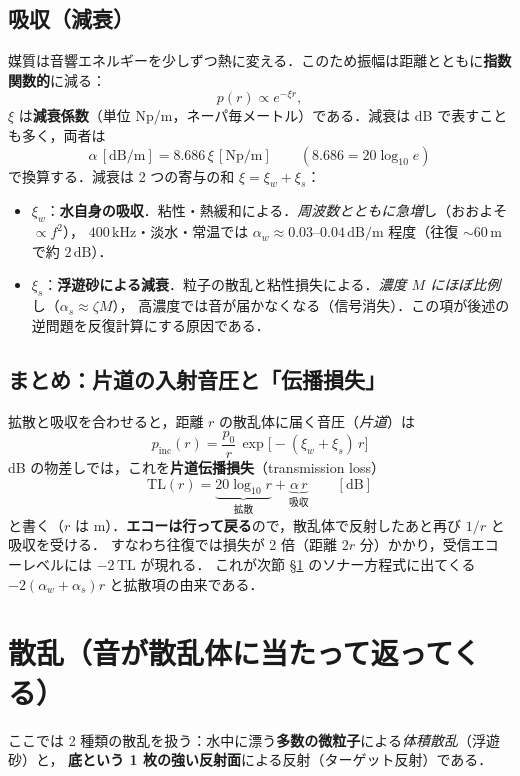 \documentclass[11pt]{ltjsarticle}
\newcommand{\unit}[1]{\,\mathrm{#1}}
\begin{document}
\subsection{吸収（減衰）}
媒質は音響エネルギーを少しずつ熱に変える．このため振幅は距離とともに\textbf{指数関数的}に減る：
\begin{equation}
p(r)\propto e^{-\xi r},
\end{equation}
$\xi$ は\textbf{減衰係数}（単位 Np/m，ネーパ毎メートル）である．減衰は dB で表すことも多く，両者は
\begin{equation}
\alpha\,[\mathrm{dB/m}]=8.686\,\xi\,[\mathrm{Np/m}]\qquad(8.686=20\log_{10}e)
\end{equation}
で換算する．減衰は 2 つの寄与の和 $\xi=\xi_w+\xi_s$：
\begin{itemize}[nosep]
  \item $\xi_w$：\textbf{水自身の吸収}．粘性・熱緩和による．\emph{周波数とともに急増}し（おおよそ $\propto f^2$），
        $400\unit{kHz}$・淡水・常温では $\alpha_w\approx 0.03$–$0.04\unit{dB/m}$ 程度（往復 $\sim\!60\unit{m}$ で約 $2\unit{dB}$）．
  \item $\xi_s$：\textbf{浮遊砂による減衰}．粒子の散乱と粘性損失による．\emph{濃度 $M$ にほぼ比例}し（$\alpha_s\approx\zeta M$），
        高濃度では音が届かなくなる（信号消失）．この項が後述の逆問題を反復計算にする原因である．
\end{itemize}

\subsection{まとめ：片道の入射音圧と「伝播損失」}
拡散と吸収を合わせると，距離 $r$ の散乱体に届く音圧（\emph{片道}）は
\begin{equation}
\boxed{\;p_{\mathrm{inc}}(r)=\frac{p_0}{r}\,\exp\!\big[-(\xi_w+\xi_s)\,r\big]\;}
\end{equation}
dB の物差しでは，これを\textbf{片道伝播損失}（transmission loss）
\begin{equation}
\mathrm{TL}(r)=\underbrace{20\log_{10} r}_{\text{拡散}}+\underbrace{\alpha\,r}_{\text{吸収}}\qquad[\mathrm{dB}]
\end{equation}
と書く（$r$ は m）．\textbf{エコーは行って戻る}ので，散乱体で反射したあと再び $1/r$ と吸収を受ける．
すなわち往復では損失が 2 倍（距離 $2r$ 分）かかり，受信エコーレベルには $-2\,\mathrm{TL}$ が現れる．
これが次節 \S\ref{sec:scatter} のソナー方程式に出てくる $-2(\alpha_w+\alpha_s)r$ と拡散項の由来である．

\section{散乱（音が散乱体に当たって返ってくる）}
\label{sec:scatter}
ここでは 2 種類の散乱を扱う：水中に漂う\textbf{多数の微粒子}による\emph{体積散乱}（浮遊砂）と，
\textbf{底という 1 枚の強い反射面}による反射（ターゲット反射）である．
\end{document}
